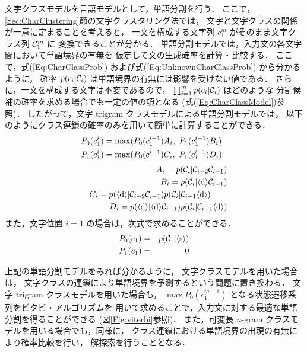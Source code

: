 文字クラスモデルを言語モデルとして，単語分割を行う．
ここで，\ref{Sec:CharClustering}節の文字クラスタリング法では，
文字と文字クラスの関係が一意に定まることを考えると，
一文を構成する文字列 $c_1^m$ がそのまま文字クラス列 ${\cal C}_1^m$ に
変換できることが分かる．
単語分割モデルでは，入力文の各文字間において単語境界の有無を
仮定して文の生成確率を計算・比較する．
ここで，式(\ref{Eq:CharClassProb}) および式(\ref{Eq:UnknownCharClassProb})
から分かるように，
確率 $p(c_i|{\cal C}_i)$ は単語境界の有無には影響を受けない値である．
さらに，一文を構成する文字は不変であるので，
$\prod_{i=1}^m p(c_i|{\cal C}_i)$ はどのような
分割候補の確率を求める場合でも一定の値の項となる
(式(\ref{Eq:CharClassModel})参照)．
したがって，文字 trigram クラスモデルによる単語分割モデルでは，
以下のようにクラス連鎖の確率のみを用いて簡単に計算することができる．
\begin{eqnarray}
\lefteqn{ P_0(c_1^i) = \max(P_0(c_1^{i-1}) A_i,~
	P_1(c_1^{i-1}) B_i)}
	\label{Eq:ClassWordSegMainNoS}\\
\lefteqn{ P_1(c_1^i) = \max(P_0(c_1^{i-1}) C_i,~
	P_1(c_1^{i-1}) D_i)}
	\label{Eq:ClassWordSegMainS}\\[3pt]
 & & A_i = p({\cal C}_i|{\cal C}_{i-2}{\cal C}_{i-1}) \nonumber\\
 & & B_i = p({\cal C}_i|\langle {\rm d}\rangle {\cal C}_{i-1}) \nonumber\\
 & & C_i = p(\langle {\rm d}\rangle|{\cal C}_{i-2}{\cal C}_{i-1}) p({\cal C}_i|{\cal C}_{i-1}\langle {\rm d}\rangle) \hspace{7mm}\nonumber\\
 & & D_i = p(\langle {\rm d}\rangle|\langle {\rm d}\rangle {\cal C}_{i-1}) p({\cal C}_i|{\cal C}_{i-1}\langle {\rm d}\rangle) \nonumber
\end{eqnarray}
また，文字位置 $i = 1$ の場合は，次式で求めることができる．
\begin{eqnarray}
P_0(c_1) &=& p({\cal C}_1|\langle {\rm s}\rangle)
	\label{Eq:ClassWordSegBeginNoS}\\
P_1(c_1) &=& 0
	\label{Eq:ClassWordSegBeginS}
\end{eqnarray}

上記の単語分割モデルをみれば分かるように，
文字クラスモデルを用いた場合は，
文字クラスの連鎖により単語境界を予測するという問題に置き換わる．
文字 trigram クラスモデルを用いた場合も，
$\max P_0(c_1^{m+1})$ となる状態遷移系列をビタビ・アルゴリズムを
用いて求めることで，入力文に対する最適な単語分割を得ることができる
(図\ref{Fig:viterbi}参照)．
また，可変長 $n$-gram クラスモデルを用いる場合でも，同様に，
クラス連鎖における単語境界の出現の有無により確率比較を行い，
解探索を行うこととなる．

